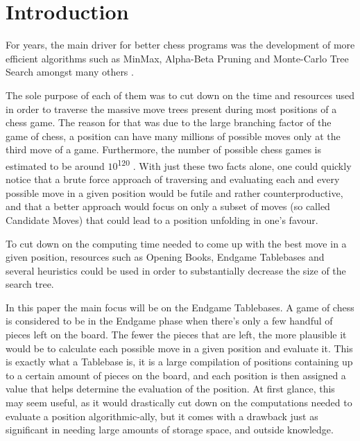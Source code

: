 \newpage
\section{Introduction}
\label{sec:Introduction}
For years, the main driver for better chess programs was the development of more efficient algorithms such as MinMax, Alpha-Beta Pruning and Monte-Carlo Tree Search amongst many others \cite{Klein}. 

The sole purpose of each of them was to cut down on the time and resources used in order to traverse the massive move trees present during most positions of a chess game. The reason for that was due to the large branching factor of the game of chess, a position can have many millions of possible moves only at the third move of a game. Furthermore, the number of possible chess games is estimated to be around $10$\textsuperscript{120} \cite{Shan50}. With just these two facts alone, one could quickly notice that a brute force approach of traversing and evaluating each and every possible move in a given position would be futile and rather counterproductive, and that a better approach would focus on only a subset of moves (so called Candidate Moves) that could lead to a position unfolding in one's favour.

To cut down on the computing time needed to come up with the best move in a given position, resources such as Opening Books, Endgame Tablebases and several heuristics could be used in order to substantially decrease the size of the search tree. 

In this paper the main focus will be on the Endgame Tablebases. A game of chess is considered to be in the Endgame phase when there's only a few handful of pieces left on the board. The fewer the pieces that are left, the more plausible it would be to calculate each possible move in a given position and evaluate it. This is exactly what a Tablebase is, it is a large compilation of positions containing up to a certain amount of pieces on the board, and each position is then assigned a value that helps determine the evaluation of the position. At first glance, this may seem useful, as it would drastically cut down on the computations needed to evaluate a position algorithmic-ally, but it comes with a drawback just as significant in needing large amounts of storage space, and outside knowledge.

